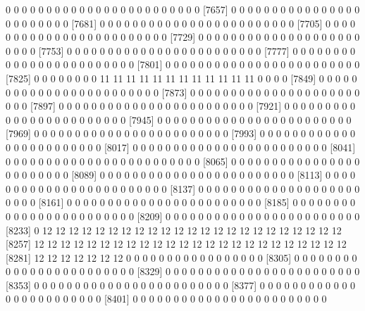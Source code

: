 \documentclass[11pt]{article}
\begin{document}
\begin{Schunk}
\begin{Soutput}
 [7633]  0  0  0  0  0  0  0  0  0  0  0  0  0  0  0  0  0  0  0  0  0  0  0  0
 [7657]  0  0  0  0  0  0  0  0  0  0  0  0  0  0  0  0  0  0  0  0  0  0  0  0
 [7681]  0  0  0  0  0  0  0  0  0  0  0  0  0  0  0  0  0  0  0  0  0  0  0  0
 [7705]  0  0  0  0  0  0  0  0  0  0  0  0  0  0  0  0  0  0  0  0  0  0  0  0
 [7729]  0  0  0  0  0  0  0  0  0  0  0  0  0  0  0  0  0  0  0  0  0  0  0  0
 [7753]  0  0  0  0  0  0  0  0  0  0  0  0  0  0  0  0  0  0  0  0  0  0  0  0
 [7777]  0  0  0  0  0  0  0  0  0  0  0  0  0  0  0  0  0  0  0  0  0  0  0  0
 [7801]  0  0  0  0  0  0  0  0  0  0  0  0  0  0  0  0  0  0  0  0  0  0  0  0
 [7825]  0  0  0  0  0  0  0  0 11 11 11 11 11 11 11 11 11 11 11 11  0  0  0  0
 [7849]  0  0  0  0  0  0  0  0  0  0  0  0  0  0  0  0  0  0  0  0  0  0  0  0
 [7873]  0  0  0  0  0  0  0  0  0  0  0  0  0  0  0  0  0  0  0  0  0  0  0  0
 [7897]  0  0  0  0  0  0  0  0  0  0  0  0  0  0  0  0  0  0  0  0  0  0  0  0
 [7921]  0  0  0  0  0  0  0  0  0  0  0  0  0  0  0  0  0  0  0  0  0  0  0  0
 [7945]  0  0  0  0  0  0  0  0  0  0  0  0  0  0  0  0  0  0  0  0  0  0  0  0
 [7969]  0  0  0  0  0  0  0  0  0  0  0  0  0  0  0  0  0  0  0  0  0  0  0  0
 [7993]  0  0  0  0  0  0  0  0  0  0  0  0  0  0  0  0  0  0  0  0  0  0  0  0
 [8017]  0  0  0  0  0  0  0  0  0  0  0  0  0  0  0  0  0  0  0  0  0  0  0  0
 [8041]  0  0  0  0  0  0  0  0  0  0  0  0  0  0  0  0  0  0  0  0  0  0  0  0
 [8065]  0  0  0  0  0  0  0  0  0  0  0  0  0  0  0  0  0  0  0  0  0  0  0  0
 [8089]  0  0  0  0  0  0  0  0  0  0  0  0  0  0  0  0  0  0  0  0  0  0  0  0
 [8113]  0  0  0  0  0  0  0  0  0  0  0  0  0  0  0  0  0  0  0  0  0  0  0  0
 [8137]  0  0  0  0  0  0  0  0  0  0  0  0  0  0  0  0  0  0  0  0  0  0  0  0
 [8161]  0  0  0  0  0  0  0  0  0  0  0  0  0  0  0  0  0  0  0  0  0  0  0  0
 [8185]  0  0  0  0  0  0  0  0  0  0  0  0  0  0  0  0  0  0  0  0  0  0  0  0
 [8209]  0  0  0  0  0  0  0  0  0  0  0  0  0  0  0  0  0  0  0  0  0  0  0  0
 [8233]  0 12 12 12 12 12 12 12 12 12 12 12 12 12 12 12 12 12 12 12 12 12 12 12
 [8257] 12 12 12 12 12 12 12 12 12 12 12 12 12 12 12 12 12 12 12 12 12 12 12 12
 [8281] 12 12 12 12 12 12 12  0  0  0  0  0  0  0  0  0  0  0  0  0  0  0  0  0
 [8305]  0  0  0  0  0  0  0  0  0  0  0  0  0  0  0  0  0  0  0  0  0  0  0  0
 [8329]  0  0  0  0  0  0  0  0  0  0  0  0  0  0  0  0  0  0  0  0  0  0  0  0
 [8353]  0  0  0  0  0  0  0  0  0  0  0  0  0  0  0  0  0  0  0  0  0  0  0  0
 [8377]  0  0  0  0  0  0  0  0  0  0  0  0  0  0  0  0  0  0  0  0  0  0  0  0
 [8401]  0  0  0  0  0  0  0  0  0  0  0  0  0  0  0  0  0  0  0  0  0  0  0  0

\end{Soutput}
\end{Schunk}
\end{document}
